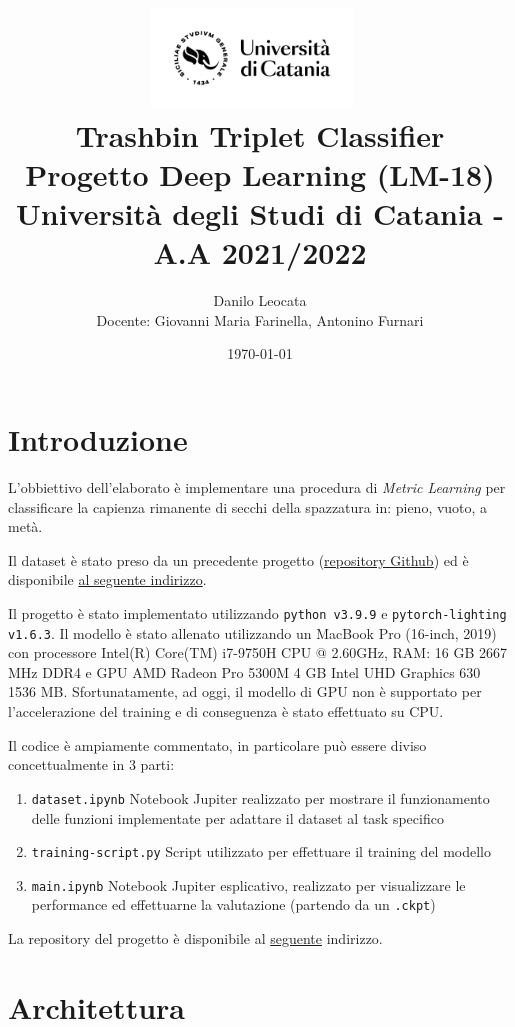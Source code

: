 \documentclass[11pt]{article}
\title{ %
\includegraphics[width=0.4\textwidth]{UniCT-Logo-Nero}~\\
Trashbin Triplet Classifier \\ 
\large Progetto Deep Learning (LM-18) \\ Università degli Studi di Catania - A.A 2021/2022 \\
}
\author{ Danilo Leocata \\ Docente: Giovanni Maria Farinella, Antonino Furnari}
\date{\today}
\begin{document}
\maketitle	
\pagebreak


\section{Introduzione}

L'obbiettivo dell'elaborato è implementare una procedura di \textit{Metric Learning} per classificare la 
capienza rimanente di secchi della spazzatura in: pieno, vuoto, a metà.

Il dataset è stato preso da un precedente progetto (\href{https://github.com/khalld/trashbin-classifier}{repository Github}) ed è disponibile \href{https://drive.google.com/drive/folders/11SGtZrM8BWJDPOcnKR7RjLJs0dJOfSCA?usp=sharing}{al seguente indirizzo}.

Il progetto è stato implementato utilizzando \texttt{python v3.9.9} e \texttt{pytorch-lighting v1.6.3}. Il modello è stato allenato utilizzando un MacBook Pro (16-inch, 2019) con processore Intel(R) Core(TM) i7-9750H CPU @ 2.60GHz, RAM: 16 GB 2667 MHz DDR4 e GPU AMD Radeon Pro 5300M 4 GB
Intel UHD Graphics 630 1536 MB. Sfortunatamente, ad oggi, il modello di GPU non è supportato per l'accelerazione del training e di conseguenza è stato effettuato su CPU.

Il codice è ampiamente commentato, in particolare può essere diviso concettualmente in 3 parti:

\begin{enumerate}
    \item \texttt{dataset.ipynb} Notebook Jupiter realizzato per mostrare il funzionamento delle funzioni implementate per adattare il dataset al task specifico
    \item \texttt{training-script.py} Script utilizzato per effettuare il training del modello
    \item \texttt{main.ipynb} Notebook Jupiter esplicativo, realizzato per visualizzare le performance ed effettuarne la valutazione (partendo da un \texttt{.ckpt})
\end{enumerate}

La repository del progetto è disponibile al \href{https://github.com/khalld/triplet-trashbin-classifier}{seguente} indirizzo.

\pagebreak

\section{Architettura}
\end{document}

